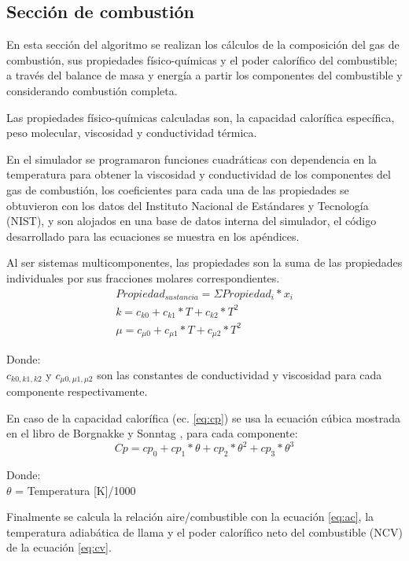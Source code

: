 \subsection{Sección de combustión}
\par En esta sección del algoritmo se realizan los cálculos de la composición del gas de combustión, sus propiedades físico-químicas y el poder calorífico del combustible; a través del balance de masa y energía a partir los componentes del combustible y considerando combustión completa.
\par Las propiedades físico-químicas calculadas son, la capacidad calorífica específica, peso molecular, viscosidad y conductividad térmica.
\par En el simulador se programaron funciones cuadráticas con dependencia en la temperatura para obtener la viscosidad y conductividad de los componentes del gas de combustión, los coeficientes para cada una de las propiedades se obtuvieron con los datos del Instituto Nacional de Estándares y Tecnología (NIST)\cite{nist}, y son alojados en una base de datos interna del simulador, el código desarrollado para las ecuaciones se muestra en los apéndices.
\par Al ser sistemas multicomponentes, las propiedades son la suma de las propiedades individuales por sus fracciones molares correspondientes.
\begin{gather}
    Propiedad_{sustancia} = \Sigma Propiedad_{i} * x_i \\
    k = c_{k0} + c_{k1}*T + c_{k2}*T^2 \\
    \mu = c_{\mu0} + c_{\mu1}*T + c_{\mu2}*T^2
\end{gather}
\par Donde:\\
$c_{k0,k1,k2}$ y $c_{\mu0,\mu1,\mu2}$ son las constantes de conductividad y viscosidad para cada componente respectivamente.
\par En caso de la capacidad calorífica (ec. \ref{eq:cp}) se usa la ecuación cúbica mostrada en el libro de Borgnakke y Sonntag \cite{bib:vanwylen}, para cada componente: 
\begin{equation}
\label{eq:cp}
    Cp = cp_0 + cp_1*\theta + cp_2*\theta^2 + cp_3*\theta^3
\end{equation}
\par Donde:\\
$\theta$ = Temperatura [K]/1000
\par Finalmente se calcula la relación aire/combustible con la ecuación \ref{eq:ac}, la temperatura adiabática de llama y el poder calorífico neto del combustible (NCV) de la ecuación \ref{eq:cv}.

